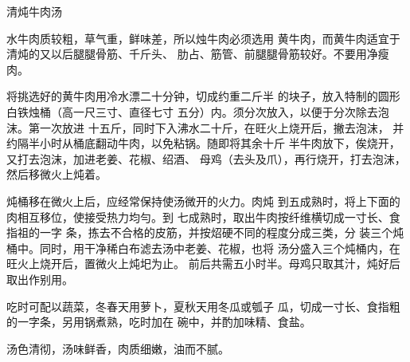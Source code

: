 \begin{recipe}{清炖牛肉汤}

\ingredients



\cooking

水牛肉质较粗，草气重，鲜味差，所以烛牛肉必须选用 黄牛肉，而黄牛肉适宜于清炖的又以后腿腿骨筋、千斤头、 肋占、筋管、前腿腿骨筋较好。不要用净瘦肉。

将挑选好的黄牛肉用冷水漂二十分钟，切成约重二斤半 的块子，放入特制的圆形白铁烛桶（高一尺三寸、直径七寸 五分）内。须分次放入，以便于分次除去泡沫。第一次放进 十五斤，同时下入沸水二十斤，在旺火上烧开后，撇去泡沫， 并约隔半小时从桶底翻动牛肉，以免粘锅。随即将其余十斤 半牛肉放下，俟烧开，又打去泡沫，加进老姜、花椒、绍酒、 母鸡（去头及爪），再行烧开，打去泡沫，然后移微火上炖着。

炖桶移在微火上后，应经常保持使汤微开的火力。肉炖 到五成熟时，将上下面的肉相互移位，使接受热力均勻。到 七成熟时，取出牛肉按纤维横切成一寸长、食指祖的一字 条，拣去不合格的皮筋，并按炤硬不同的程度分成三类，分 装三个炖桶中。同时，用干净稀白布滤去汤中老姜、花椒，也将 汤分盛入三个炖桶内，在旺火上烧开后，置微火上炖圯为止。 前后共需五小时半。母鸡只取其汁，炖好后取出作别用。

吃时可配以蔬菜，冬春天用萝卜，夏秋天用冬瓜或瓠子 瓜，切成一寸长、食指粗的一字条，另用锅煮熟，吃时加在 碗中，并酌加味精、食盐。

\notes

汤色清彻，汤味鲜香，肉质细嫩，油而不腻。

\end{recipe}

